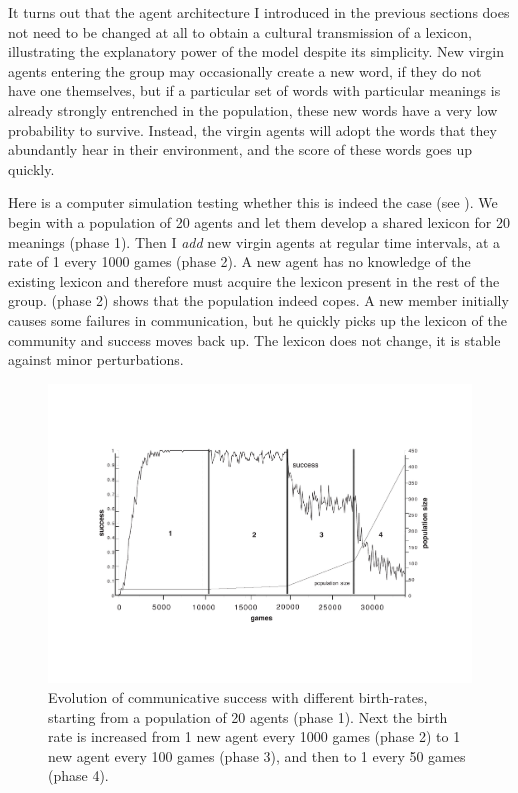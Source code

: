 It turns out that the agent architecture I introduced
in the previous sections does not 
need to be changed at all to obtain a cultural 
transmission of a lexicon, illustrating the explanatory 
power of the model despite its simplicity. New virgin agents
entering the group may occasionally create a new word, 
if they do not have one themselves, but if a 
particular set of words with particular meanings
is already strongly entrenched in the population, these
new words have a very low probability to survive.
Instead, the virgin agents will adopt the words
that they abundantly hear in their environment, and the
score of these words goes up quickly. 

Here is a computer simulation testing whether this 
is indeed the case (see ). 
We begin with a population of 20 agents and let them develop a 
shared lexicon for 20 meanings (phase 1). Then I {\it add}
new virgin agents at regular time intervals, at a rate 
of 1 every 1000 games (phase 2). A new 
agent has no knowledge of the existing lexicon and
therefore must acquire the lexicon present in the rest
of the group.  (phase 2) shows that the 
population indeed copes. A new member initially causes 
some failures in communication, but he quickly
picks up the lexicon of the community and success
moves back up. The lexicon does not change, it is 
stable against minor perturbations. 

\begin{figure}[htbp]
  \centerline{\includegraphics[width=.70\textwidth]{chap5/figs/birth}}
\caption{\label{birth} Evolution of communicative 
success with different birth-rates, starting from a
population of 20 agents (phase 1). 
Next the birth rate is increased from 1 new agent 
every 1000 games (phase 2) to 
1 new agent every 100 games (phase 3), 
and then to 1 every 50 games (phase 4).}
\end{figure}

